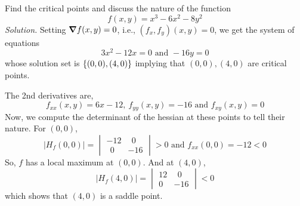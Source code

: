 \documentclass[../Analysis-3]{subfiles}
\begin{document}
\begin{Eg}{}{}
    Find the critical points and discuss the nature of the function \[ f(x,y) = x^3 - 6x^2 - 8y^2 \]
    \textit{Solution.} Setting $ \grad f(x,y) = 0 $, i.e., $ (f_x,f_y)(x,y) = 0 $, we get the system of equations
    \[ 3x^2 - 12x = 0 \text{  and  }  -16y = 0\]
    whose solution set is $ \qty{(0,0),(4,0)} $ implying that $(0,0), (4,0)$ are critical points.

    The 2nd derivatives are, \[ f_{xx}(x,y) = 6x - 12,\ f_{yy}(x,y) = -16 \text{ and } f_{xy}(x,y) = 0 \]
    Now, we compute the determinant of the hessian at these points to tell their nature. For $(0,0)$,
    \[ |H_f(0,0)| =  \begin{vmatrix}
            -12   & \ \ 0 \\
            \ \ 0 & -16
        \end{vmatrix} > 0 \text{  and  } f_{xx}(0,0) = -12 < 0\]
    So, $f$ has a local maximum at $(0,0)$. And at $(4,0)$,
    \[ |H_f(4,0)| =  \begin{vmatrix}
            12 & \ \ 0 \\
            0  & -16
        \end{vmatrix} < 0 \]
    which shows that $(4,0)$ is a saddle point.
\end{Eg}
\end{document}
